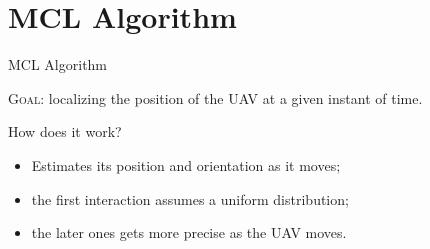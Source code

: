 \section{MCL Algorithm}


\begin{frame}{MCL Algorithm}
    
    {\scshape Goal:} localizing the position of the UAV at a given instant of time.

    \begin{block}{How does it work?}
        \begin{itemize}
            \item Estimates its position and orientation as it moves;
            \item the first interaction assumes a uniform distribution;
            \item the later ones gets more precise as the UAV moves.
        \end{itemize}
    \end{block}

\end{frame}


